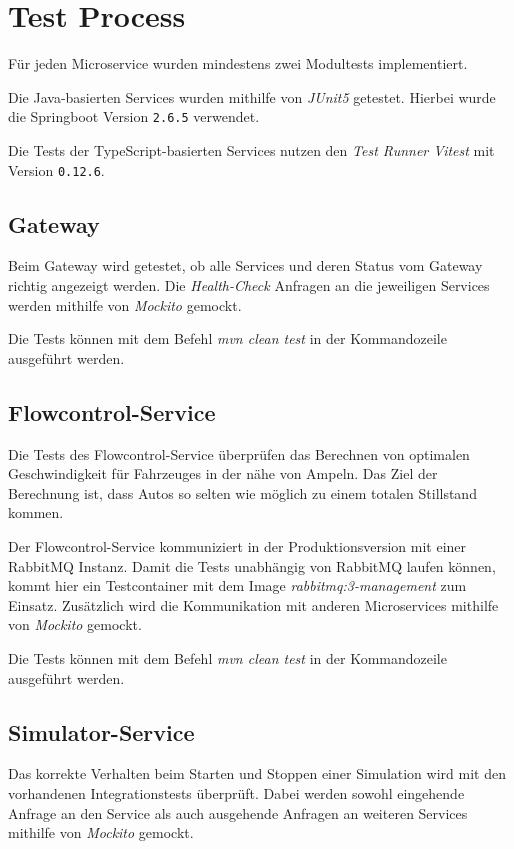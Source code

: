 \section{Test Process}

Für jeden Microservice wurden mindestens zwei Modultests implementiert.

Die Java-basierten Services wurden mithilfe von \textit{JUnit5} getestet.
Hierbei wurde die Springboot Version \verb|2.6.5| verwendet.

Die Tests der TypeScript-basierten Services nutzen den \textit{Test Runner Vitest}  mit Version \verb|0.12.6|.

\subsection{Gateway}

Beim Gateway wird getestet, ob alle Services und deren Status vom Gateway richtig angezeigt werden.
Die \textit{Health-Check} Anfragen an die jeweiligen Services werden mithilfe von \textit{Mockito} gemockt. 

Die Tests können mit dem Befehl \textit{mvn clean test} in der Kommandozeile ausgeführt werden.

\subsection{Flowcontrol-Service}

Die Tests des Flowcontrol-Service überprüfen das Berechnen von optimalen Geschwindigkeit für Fahrzeuges in der nähe von Ampeln.
Das Ziel der Berechnung ist, dass Autos so selten wie möglich zu einem totalen Stillstand kommen.

Der Flowcontrol-Service kommuniziert in der Produktionsversion mit einer RabbitMQ Instanz.
Damit die Tests unabhängig von RabbitMQ laufen können, kommt hier ein Testcontainer mit dem Image \textit{rabbitmq:3-management} zum Einsatz.
Zusätzlich wird die Kommunikation mit anderen Microservices mithilfe von \textit{Mockito} gemockt.

Die Tests können mit dem Befehl \textit{mvn clean test} in der Kommandozeile ausgeführt werden. 

\subsection{Simulator-Service}

Das korrekte Verhalten beim Starten und Stoppen einer Simulation wird mit den vorhandenen Integrationstests überprüft.
Dabei werden sowohl eingehende Anfrage an den Service als auch ausgehende Anfragen an weiteren Services mithilfe von \textit{Mockito} gemockt.

